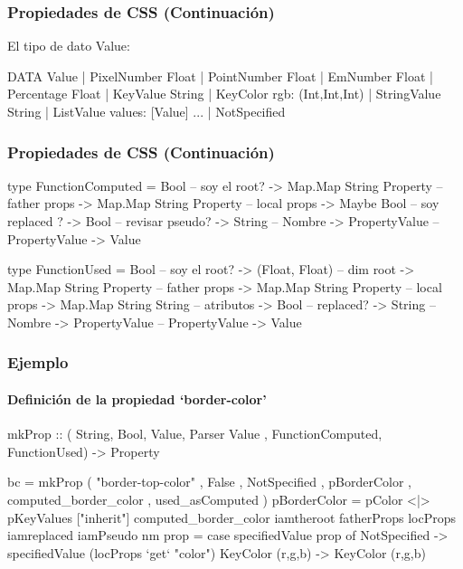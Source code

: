\documentclass[12pt]{beamer}
\begin{document}
\begin{frame}[fragile]
\frametitle{Propiedades de CSS (Continuación)}
El tipo de dato Value:
\begin{block}{}
\begin{ag}
DATA Value
  | PixelNumber   Float
  | PointNumber   Float
  | EmNumber      Float
  | Percentage    Float
  | KeyValue      String
  | KeyColor      rgb: {(Int,Int,Int)}
  | StringValue   String
  | ListValue     values: {[Value]}
  ...
  | NotSpecified
\end{ag}
\end{block}
\end{frame}

\begin{frame}[fragile]
\frametitle{Propiedades de CSS (Continuación)}
\begin{block}{}
\begin{hs}
type FunctionComputed
    =  Bool                     -- soy el root?
    -> Map.Map String Property  -- father props
    -> Map.Map String Property  -- local  props
    -> Maybe Bool               -- soy replaced ?
    -> Bool                     -- revisar pseudo?
    -> String                   -- Nombre
    -> PropertyValue            -- PropertyValue
    -> Value

type FunctionUsed 
    =  Bool                     -- soy el root?
    -> (Float, Float)           -- dim root
    -> Map.Map String Property  -- father props
    -> Map.Map String Property  -- local props
    -> Map.Map String String    -- atributos
    -> Bool                     -- replaced?
    -> String                   -- Nombre
    -> PropertyValue            -- PropertyValue
    -> Value
\end{hs}
\end{block}
\end{frame}

\begin{frame}[fragile]
\frametitle{Ejemplo}
\framesubtitle{Definición de la propiedad `border-color'}
\begin{block}{}
\begin{hs}
mkProp :: ( String, Bool, Value, Parser Value
		  , FunctionComputed, FunctionUsed) -> Property

bc = mkProp ( "border-top-color"
            , False 
            , NotSpecified
            , pBorderColor
            , computed_border_color
            , used_asComputed )
pBorderColor 
    = pColor <|> pKeyValues ["inherit"]
computed_border_color 
  iamtheroot fatherProps locProps iamreplaced iamPseudo nm prop
    = case specifiedValue prop of
        NotSpecified 
            -> specifiedValue (locProps `get` "color")
        KeyColor (r,g,b) 
            -> KeyColor (r,g,b)
\end{hs}
\end{block}
\end{frame}
\end{document}
